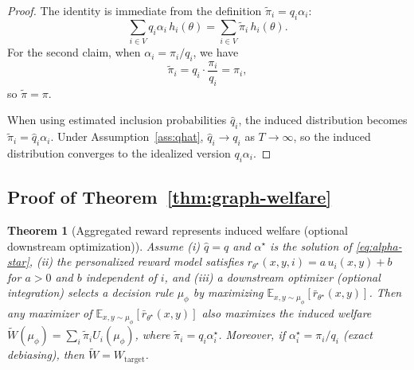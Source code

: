\documentclass{article}
\newtheorem*{theorem*}{Theorem}
\theoremstyle{plain}
\theoremstyle{definition}
\theoremstyle{remark}
\begin{document}
\begin{proof}
The identity is immediate from the definition $\tilde\pi_i = q_i \alpha_i$:
\begin{equation}
    \sum_{i \in V} q_i \alpha_i \, h_i(\theta)
    =
    \sum_{i \in V} \tilde\pi_i \, h_i(\theta).
\end{equation}
For the second claim, when $\alpha_i = \pi_i / q_i$, we have
\begin{equation}
    \tilde\pi_i = q_i \cdot \frac{\pi_i}{q_i} = \pi_i,
\end{equation}
so $\tilde\pi = \pi$.

When using estimated inclusion probabilities $\hat q_i$, the induced
distribution becomes $\tilde\pi_i = \hat q_i \alpha_i$. Under
Assumption~\ref{ass:qhat}, $\hat q_i \to q_i$ as $T \to \infty$, so the
induced distribution converges to the idealized version $q_i \alpha_i$.
\end{proof}

\subsection{Proof of Theorem~\ref{thm:graph-welfare}}
\label{app:proof-graph-welfare}

\begin{theorem*}[Aggregated reward represents induced welfare (optional downstream optimization)]
Assume (i) $\hat q = q$ and $\alpha^\star$ is the solution of
\eqref{eq:alpha-star}, (ii) the personalized reward model satisfies
$r_{\theta^\star}(x,y,i) = a \, u_i(x,y) + b$ for $a > 0$ and $b$ independent
of $i$, and (iii) a downstream optimizer (optional integration) selects a decision rule $\mu_\phi$ by maximizing
$\mathbb{E}_{x,y \sim \mu_\phi}[\bar r_{\theta^\star}(x,y)]$.
Then any maximizer of $\mathbb{E}_{x,y \sim \mu_\phi}[\bar r_{\theta^\star}(x,y)]$ also maximizes the induced welfare
$\widetilde{W}(\mu_\phi) = \sum_i \tilde\pi_i U_i(\mu_\phi)$, where
$\tilde\pi_i = q_i \alpha_i^\star$. Moreover, if
$\alpha_i^\star = \pi_i / q_i$ (exact debiasing), then
$\widetilde{W} = W_{\text{target}}$.
\end{theorem*}
\end{document}
